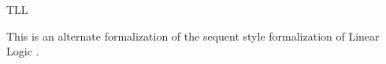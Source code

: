 \begin{entry}{TLL}
\begin{calculus}
\end{calculus}


\begin{clarifications}
This is an alternate formalization of the sequent style formalization
of Linear Logic .
\end{clarifications}




%
%
%
%
%
%
% 
%




\end{entry}
